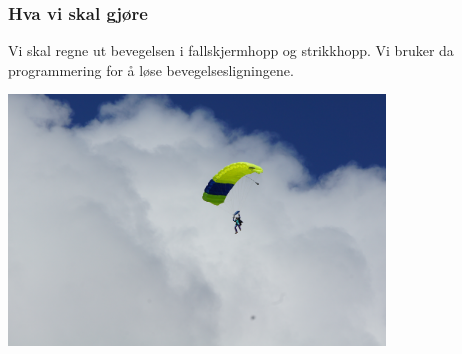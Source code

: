 \documentclass[english, 12pt]{beamer}
\newcommand{\alrt}{\color{AlertColor}}
\renewcommand{\d}{\textrm{d}}
\begin{document}
\begin{frame}
\frametitle{Hva vi skal gjøre }



Vi skal regne ut bevegelsen i fallskjermhopp og strikkhopp. Vi bruker da programmering for å løse bevegelsesligningene.

\vspace{0.5cm}

\begin{center}
\includegraphics[width=0.75\textwidth]{skydiving}
\end{center}
\end{frame}









\end{document}

